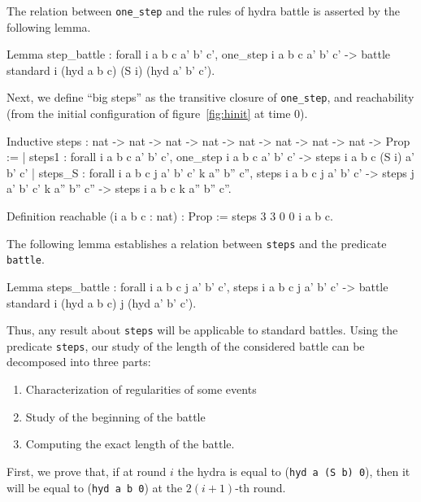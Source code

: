 The relation between \texttt{one\_step} and the rules of hydra battle is asserted by the following lemma. 

\label{lemma:step-battle}

\begin{Coqsrc}
Lemma step_battle : forall i a b c a' b' c', 
   one_step i a b c a' b' c' ->
   battle standard i (hyd  a b c)  (S i) (hyd a' b' c').
\end{Coqsrc}

Next, we define ``big steps'' as the transitive closure of \texttt{one\_step},
and reachability (from the initial configuration of figure~\ref{fig:hinit} at time $0$).



\begin{Coqsrc}
 Inductive steps : nat -> nat -> nat -> nat ->
                  nat -> nat -> nat -> nat -> Prop :=
| steps1 : forall i a b c a' b' c',
    one_step i a b c a' b' c' -> steps i a b c (S i) a' b' c'
| steps_S : forall i a b c j a' b' c' k a'' b'' c'',
    steps i a b c j a' b' c' ->
    steps j a' b' c' k a'' b'' c'' ->
    steps i a b c k  a'' b'' c''.

Definition reachable (i a b c : nat) : Prop :=
  steps 3 3 0 0 i a b c.
\end{Coqsrc}


The following lemma establishes a relation between \texttt{steps} and the predicate \texttt{battle}.

\begin{Coqsrc}
 Lemma steps_battle : forall i a b c j a' b' c', 
   steps i a b c j a' b' c' ->
   battle standard i (hyd  a b c)   j  (hyd a' b' c').
\end{Coqsrc}

Thus, any result about \texttt{steps} will be applicable to standard battles.
Using the predicate \texttt{steps},  our study of the length of the considered battle
can  be decomposed into three parts:

\begin{enumerate}
\item  Characterization of regularities of some events
\item Study of the beginning of the battle
\item Computing the exact length of the battle.
\end{enumerate}

First, we prove that, if at round $i$ the hydra is equal to
(\texttt{hyd a (S b) 0}), then it will be equal to (\texttt{hyd a b 0}) at the $2(i+1)$-th round.  

